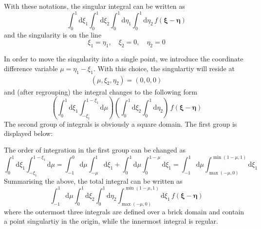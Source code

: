\documentclass{article}
\newcommand{\td}{\mathrm{d}}
\begin{document}
With these notations, the singular integral can be written as
%
\begin{equation}
\int_{0}^{1} \td \xi_1
\int_{0}^{1} \td \xi_2
\int_{0}^{1} \td \eta_1
\int_{0}^{1} \td \eta_2
\, f(\bm{\xi}-\bm{\eta})
\end{equation}
%
and the singularity is on the line
%
\begin{equation}
\xi_1 = \eta_1, \quad
\xi_2 = 0, \quad
\eta_2 = 0
\end{equation}

In order to move the singularity into a single point, we introduce the coordinate difference variable $\mu = \eta_1-\xi_1$. With this choice, the singulartiy will reside at
%
\begin{align}
(\mu, \xi_2, \eta_2) = (0, 0, 0)
\end{align}
%
and (after regrouping) the integral changes to the following form
%
\begin{equation}
\left(
\int_{0}^{1} \td \xi_1
\int_{-\xi_1}^{1-\xi_1} \td \mu
\right)
\left(
\int_{0}^{1} \td \xi_2
\int_{0}^{1} \td \eta_2
\right)
\, f(\bm{\xi}-\bm{\eta})
\end{equation}
%
The second group of integrals is obviously a square domain. The first group is displayed below:


The order of integration in the first group can be changed as
%
\begin{equation}
\int_{0}^{1} \td \xi_1
\int_{-\xi_1}^{1-\xi_1} \td \mu
=
\int_{-1}^{0} \td \mu
\int_{-\mu}^{1} \td \xi_1
+
\int_{0}^{1} \td \mu
\int_{0}^{1-\mu} \td \xi_1
=
\int_{-1}^{1} \td \mu
\int_{\max(-\mu,0)}^{\min(1-\mu,1)} \td \xi_1
\end{equation}
%
Summarising the above, the total integral can be written as
%
\begin{equation}
\int_{-1}^{1} \td \mu
\int_{0}^{1} \td \xi_2
\int_{0}^{1} \td \eta_2
\int_{\max(-\mu,0)}^{\min(1-\mu,1)} \td \xi_1
\, f(\bm{\xi}-\bm{\eta})
\end{equation}
%
where the outermost three integrals are defined over a brick domain and contain a point singulartiy in the origin, while the innermost integral is regular.
\end{document}
